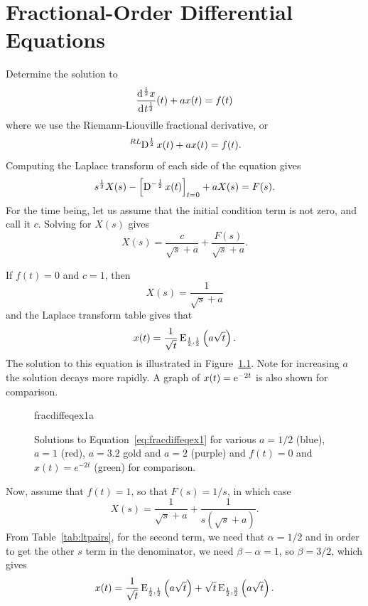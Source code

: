 \chapter{Fractional-Order Differential Equations}

\begin{example}
  Determine the solution to
  \begin{equation*}
    \frac{\operatorname{d}\hspace*{-1pt}^{\frac{1}{2}}x}{\operatorname{d}\hspace*{-1pt} t^{\frac{1}{2}}}(t) + a x(t) = f(t)
  \end{equation*}
  where we use the Riemann-Liouville fractional derivative, or
  \begin{equation}
    \tensor*[^{RL}]{\D}{^{\frac{1}{2}}} x(t) + a x(t) = f(t).
    \label{eq:fracdiffeqex1}
  \end{equation}
Computing the Laplace transform of each side of the equation gives
\begin{equation*}
  s^\frac{1}{2} X(s) - \left[ \tensor*[]{\D}{^{-\frac{1}{2}}} x(t) \right]_{t=0} + a X(s) = F(s).
\end{equation*}
For the time being, let us assume that the initial condition term is not zero, and call it $c$. Solving for $X(s)$ gives
\begin{equation*}
  X(s) = \frac{c}{\sqrt{s} + a} + \frac{F(s)}{\sqrt{s} + a}.
\end{equation*}

If $f(t) = 0$ and $c = 1$, then
\begin{equation*}
  X(s) = \frac{1}{\sqrt{s}+a}
\end{equation*}
and the Laplace transform table gives that 
\begin{equation*}
  x(t) = \frac{1}{\sqrt{t}} \operatorname{E}_{\frac{1}{2},\frac{1}{2}}\left( a \sqrt{t} \right). 
\end{equation*}
The solution to this equation is illustrated in Figure~\ref{fig:fracdiffeqex1a}. Note for increasing $a$ the solution decays more rapidly. A graph of $x(t) = \operatorname{e}^{-2 t}$ is also shown for comparison.

\begin{figure}
  \centering
  {fracdiffeqex1a}
  \caption{Solutions to Equation~\ref{eq:fracdiffeqex1} for various $a = 1/2$ (blue), $a=1$ (red), $a=3.2$ gold and $a=2$ (purple) and $f(t)=0$ and $x(t) = e^{-2 t}$ (green) for comparison.}
  \label{fig:fracdiffeqex1a}
\end{figure}

Now, assume that $f(t) = 1$, so that $F(s) = 1/s$, in which case
\begin{equation}
  X(s) = \frac{1}{\sqrt{s} + a} + \frac{1}{s \left( \sqrt{s} + a \right)}.
\end{equation}
From Table~\ref{tab:ltpairs}, for the second term, we need that $\alpha = 1/2$ and in order to get the other $s$ term in the denominator, we need $\beta - \alpha = 1$, so $\beta = 3/2$, which gives
\begin{equation*}
  x(t) = \frac{1}{\sqrt{t}} \operatorname{E}_{\frac{1}{2},\frac{1}{2}} \left( a \sqrt{t} \right) + \sqrt{t} \operatorname{E}_{\frac{1}{2},\frac{3}{2}} \left( a \sqrt{t} \right).
\end{equation*}


\end{example}
